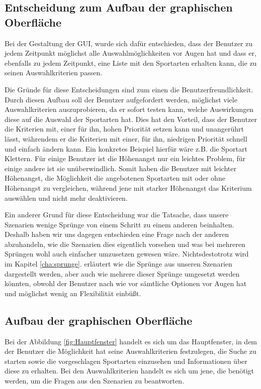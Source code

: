 \subsection{Entscheidung zum Aufbau der graphischen Oberfl\"ache}
Bei der Gestaltung der GUI, wurde sich daf\"ur entschieden, dass der Benutzer zu jedem Zeitpunkt m\"oglichst alle Auswahlm\"oglichkeiten vor Augen hat und dass er, ebenfalls zu jedem Zeitpunkt, eine Liste mit den Sportarten erhalten kann, die zu seinen Auswahlkriterien passen.

Die Gr\"unde f\"ur diese Entscheidungen sind zum einen die Benutzerfreundlichkeit. Durch diesen Aufbau soll der Benutzer aufgefordert werden, m\"oglichst viele Auswahlkriterien auszuprobieren, da er sofort testen kann, welche Auswirkungen diese auf die Auswahl der Sportarten hat. Dies hat den Vorteil, dass der Benutzer die Kriterien mit, einer f\"ur ihn, hohen Priorit\"at setzen kann und unanger\"uhrt l\"asst, w\"ahrendem er die Kriterien mit einer, f\"ur ihn, niedrigen Priorit\"at schnell und einfach \"andern kann. Ein konkretes Beispiel hierf\"ur w\"are z.B. die Sportart Klettern. F\"ur einige Benutzer ist die H\"ohenangst nur ein leichtes Problem, f\"ur einige andere ist sie un\"uberwindlich. Somit haben die Benutzer mit leichter H\"ohenangst, die M\"oglichkeit die angebotenen Sportarten mit oder ohne H\"ohenangst zu vergleichen, w\"ahrend jene mit starker H\"ohenangst das Kriterium ausw\"ahlen und nicht mehr deaktivieren.

Ein anderer Grund f\"ur diese Entscheidung war die Tatsache, dass unsere Szenarien wenige Spr\"unge von einem Schritt zu einem anderen beinhalten. Deshalb haben wir uns dagegen entschieden eine Frage nach der anderen abzuhandeln, wie die Szenarien dies eigentlich vorsehen und was bei mehreren Spr\"ungen wohl auch einfacher umzusetzen gewesen w\"are. Nichtsdestotrotz wird im Kapitel \ref{cha:sprunge}.  erl\"autert wie die Spr\"unge aus unseren Szenarien dargestellt werden, aber auch wie mehrere dieser Spr\"unge umgesetzt werden k\"onnten, obwohl der Benutzer nach wie vor s\"amtliche Optionen vor Augen hat und m\"oglichst wenig an Flexibilit\"at einb\"ußt.

\subsection{Aufbau der graphischen Oberfl\"ache}

Bei der Abbildung \ref{fig:Hauptfenster} handelt es sich um das Hauptfenster, in dem der Benutzer die M\"oglichkeit hat seine Auswahlkriterien festzulegen, die Suche zu starten sowie die vorgeschlagen Sportarten einzusehen und Informationen \"uber diese zu erhalten. Bei den Auswahlkriterien handelt es sich um jene, die ben\"otigt werden, um die Fragen aus den Szenarien zu beantworten.

